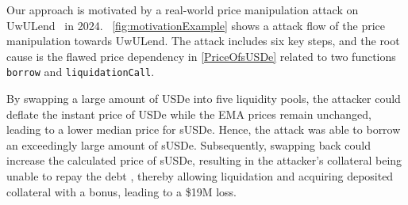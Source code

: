 Our approach is motivated by a real-world price manipulation attack on UwULend~\cite{MotivationAnalysis,MotivationTrax} in 2024. \myfig~\ref{fig:motivationExample} shows a attack flow of the price manipulation towards UwULend. The attack includes six key steps, and the root cause is the flawed price dependency in \cref{PriceOfsUSDe} related to two functions \texttt{borrow} and \texttt{liquidationCall}.

By swapping a large amount of USDe into five liquidity pools, the attacker could deflate the instant price of USDe while the EMA prices remain unchanged, leading to a lower median price for sUSDe.
Hence, the attack was able to borrow an exceedingly large amount of sUSDe. 
Subsequently, swapping back could increase the calculated price of sUSDe, {resulting in the attacker's collateral being unable to repay the debt}
, thereby allowing liquidation and acquiring deposited collateral with a bonus, leading to a \$19M loss.

